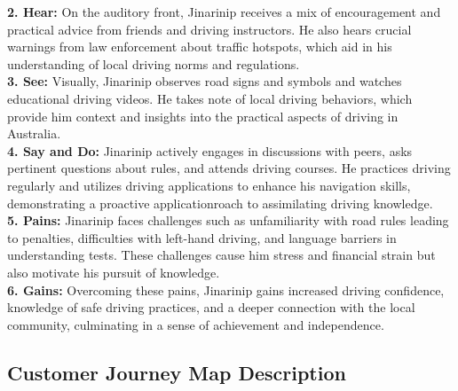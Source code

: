 \documentclass[12pt,a4paper]{article}
\begin{document}
\noindent\textbf{2. Hear:} On the auditory front, Jinarinip receives a mix of encouragement and practical advice from friends and driving instructors. He also hears crucial warnings from law enforcement about traffic hotspots, which aid in his understanding of local driving norms and regulations.\\

\noindent\textbf{3. See:} Visually, Jinarinip observes road signs and symbols and watches educational driving videos. He takes note of local driving behaviors, which provide him context and insights into the practical aspects of driving in Australia.\\

\noindent\textbf{4. Say and Do:} Jinarinip actively engages in discussions with peers, asks pertinent questions about rules, and attends driving courses. He practices driving regularly and utilizes driving applications to enhance his navigation skills, demonstrating a proactive applicationroach to assimilating driving knowledge.\\

\noindent\textbf{5. Pains:} Jinarinip faces challenges such as unfamiliarity with road rules leading to penalties, difficulties with left-hand driving, and language barriers in understanding tests. These challenges cause him stress and financial strain but also motivate his pursuit of knowledge.\\

\noindent\textbf{6. Gains:} Overcoming these pains, Jinarinip gains increased driving confidence, knowledge of safe driving practices, and a deeper connection with the local community, culminating in a sense of achievement and independence.\\

\label{sec:Question 3}
\subsection{Customer Journey Map Description}
\end{document}
